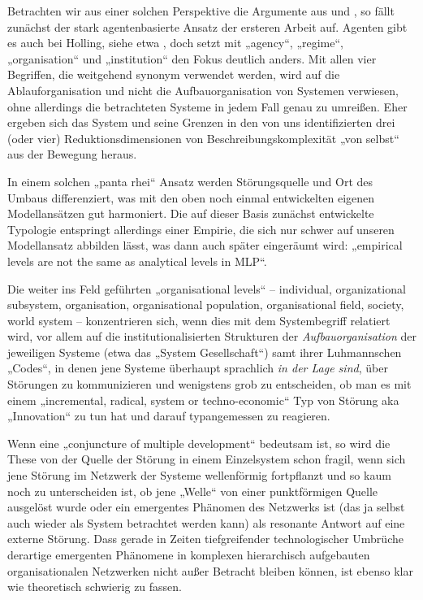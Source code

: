 \documentclass[11pt,a4paper]{article}
\begin{document}
Betrachten wir aus einer solchen Perspektive die Argumente aus
\cite{Geels2007} und \cite{Holling2000}, so fällt zunächst der stark
agentenbasierte Ansatz der ersteren Arbeit auf. Agenten gibt es auch bei
Holling, siehe etwa \cite[Tab. 2]{Holling2000}, doch setzt \cite{Geels2007}
mit „agency“, „regime“, „organisation“ und „institution“ den Fokus deutlich
anders. Mit allen vier Begriffen, die weitgehend synonym verwendet werden,
wird auf die Ablauforganisation und nicht die Aufbauorganisation von Systemen
verwiesen, ohne allerdings die betrachteten Systeme in jedem Fall genau zu
umreißen. Eher ergeben sich das System und seine Grenzen in den von uns
identifizierten drei (oder vier) Reduktionsdimensionen von
Beschreibungskomplexität „von selbst“ aus der Bewegung heraus.

In einem solchen „panta rhei“ Ansatz werden \cite[S. 401]{Geels2007}
Störungsquelle und Ort des Umbaus differenziert, was mit den oben noch einmal
entwickelten eigenen Modellansätzen gut harmoniert. Die auf dieser Basis
zunächst entwickelte Typologie \cite[Fig. 2]{Geels2007} entspringt allerdings
einer Empirie, die sich nur schwer auf unseren Modellansatz abbilden lässt,
was dann auch später \cite[S. 402]{Geels2007} eingeräumt wird: „empirical
levels are not the same as analytical levels in MLP“.

Die weiter ins Feld geführten „organisational levels“ -- individual,
organizational subsystem, organisation, organisational population,
organisational field, society, world system -- konzentrieren sich, wenn dies
mit dem Systembegriff relatiert wird, vor allem auf die institutionalisierten
Strukturen der \emph{Aufbauorganisation} der jeweiligen Systeme (etwa das
„System Gesellschaft“) samt ihrer Luhmannschen „Codes“, in denen jene Systeme
überhaupt sprachlich \emph{in der Lage sind}, über Störungen zu kommunizieren
und wenigstens grob zu entscheiden, ob man es mit einem „incremental, radical,
system or techno-economic“ Typ von Störung aka „Innovation“ zu tun hat und
darauf typangemessen zu reagieren.

Wenn eine „conjuncture of multiple development“ \cite[3.2.]{Geels2007}
bedeutsam ist, so wird die These von der Quelle der Störung in einem
Einzelsystem schon fragil, wenn sich jene Störung im Netzwerk der Systeme
wellenförmig fortpflanzt und so kaum noch zu unterscheiden ist, ob jene
„Welle“ von einer punktförmigen Quelle ausgelöst wurde oder ein emergentes
Phänomen des Netzwerks ist (das ja selbst auch wieder als System betrachtet
werden kann) als resonante Antwort auf eine externe Störung. Dass gerade in
Zeiten tiefgreifender technologischer Umbrüche derartige emergenten Phänomene
in komplexen hierarchisch aufgebauten organisationalen Netzwerken nicht außer
Betracht bleiben können, ist ebenso klar wie theoretisch schwierig zu fassen.
\end{document}
